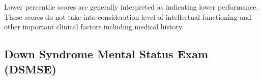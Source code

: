 Lower percentile scores are generally interpreted as indicating lower performance. These scores do not take into consideration level of intellectual functioning and other important clinical factors including medical history.

\subsection{Down Syndrome Mental Status Exam (DSMSE)}